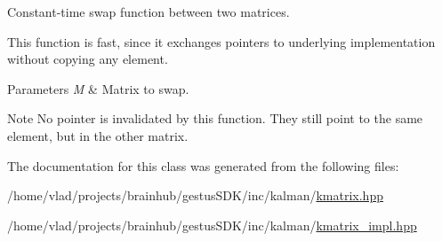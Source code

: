 Constant-\/time swap function between two matrices. 

This function is fast, since it exchanges pointers to underlying implementation without copying any element. 
\begin{DoxyParams}{Parameters}
{\em M} & Matrix to swap. \\
\hline
\end{DoxyParams}
\begin{DoxyNote}{Note}
No pointer is invalidated by this function. They still point to the same element, but in the other matrix. 
\end{DoxyNote}


The documentation for this class was generated from the following files\+:\begin{DoxyCompactItemize}
\item 
/home/vlad/projects/brainhub/gestus\+S\+D\+K/inc/kalman/\mbox{\hyperlink{kmatrix_8hpp}{kmatrix.\+hpp}}\item 
/home/vlad/projects/brainhub/gestus\+S\+D\+K/inc/kalman/\mbox{\hyperlink{kmatrix__impl_8hpp}{kmatrix\+\_\+impl.\+hpp}}\end{DoxyCompactItemize}
